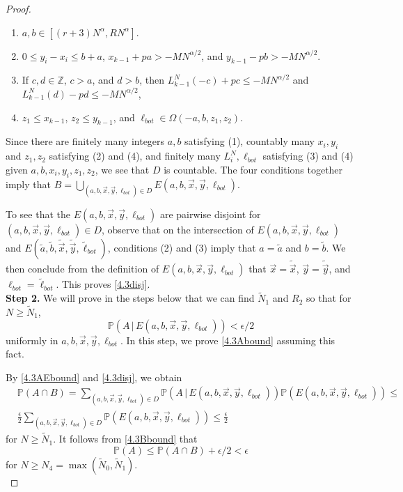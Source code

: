 \begin{proof}
\begin{enumerate}[label=(\arabic*)]
			\item $a,b\in[(r+3)N^\alpha,RN^\alpha]$.
			
			\item $0 \leq y_i - x_i \leq b+a$, $x_{k-1} + pa > - MN^{\alpha/2}$, and $y_{k-1} - pb > - MN^{\alpha/2}$.
			
			\item If $c,d\in\mathbb{Z}$, $c > a$, and $d > b$, then $L_{k-1}^N(-c) + pc \leq -MN^{\alpha/2}$ and $L_{k-1}^N(d) - pd \leq -MN^{\alpha/2}$,
			
			\item $z_1\leq x_{k-1}$, $z_2\leq y_{k-1}$, and $\ell_{bot}\in\Omega(-a,b,z_1,z_2)$.
			
		\end{enumerate} 
		Since there are finitely many integers $a,b$ satisfying (1), countably many $x_i,y_i$ and $z_1,z_2$ satisfying (2) and (4), and finitely many $L_i^N,\ell_{bot}$ satisfying (3) and (4) given $a,b,x_i,y_i,z_1,z_2$, we see that $D$ is countable. The four conditions together imply that $B = \bigcup_{(a,b,\vec{x},\vec{y},\ell_{bot})\in D} E(a,b,\vec{x},\vec{y},\ell_{bot})$.
		
		To see that the $E(a,b,\vec{x},\vec{y},\ell_{bot})$ are pairwise disjoint for $(a,b,\vec{x},\vec{y},\ell_{bot})\in D$, observe that on the intersection of $E(a,b,\vec{x},\vec{y},\ell_{bot})$ and $E(\tilde a,\tilde b,\tilde{\vec{x}},\tilde{\vec{y}},\tilde{\ell}_{bot})$, conditions (2) and (3) imply that $a=\tilde{a}$ and $b=\tilde{b}$. We then conclude from the definition of $E(a,b,\vec{x},\vec{y},\ell_{bot})$ that $\vec{x}=\tilde{\vec{x}}$, $\vec{y} = \tilde{\vec{y}}$, and $\ell_{bot} = \tilde{\ell}_{bot}$. This proves \eqref{4.3disj}.\\
		
		\noindent\textbf{Step 2.} We will prove in the steps below that we can find $\tilde{N}_1$ and $R_2$ so that for $N\geq\tilde{N}_1$,
		\begin{equation}\label{4.3AEbound}
		\mathbb{P}(A\,|\,E(a,b,\vec{x},\vec{y},\ell_{bot})) < \epsilon/2
		\end{equation}
		uniformly in $a,b,\vec{x},\vec{y},\ell_{bot}$. In this step, we prove \eqref{4.3Abound} assuming this fact.
		
		By \eqref{4.3AEbound} and \eqref{4.3disj}, we obtain
		\begin{align*}
		&\mathbb{P}(A \cap B) = \sum_{(a,b,\vec{x},\vec{y},\ell_{bot})\in D} \mathbb{P}(A\,|\,E(a,b,\vec{x},\vec{y},\ell_{bot}))\mathbb{P}(E(a,b,\vec{x},\vec{y},\ell_{bot})) \leq\\
		& \frac{\epsilon}{2}\sum_{(a,b,\vec{x},\vec{y},\ell_{bot})\in D} \mathbb{P}(E(a,b,\vec{x},\vec{y},\ell_{bot})) \leq \frac{\epsilon}{2}
		\end{align*}
		for $N\geq\tilde{N}_1$. It follows from \eqref{4.3Bbound} that
		\begin{equation*}
		\mathbb{P}(A) \leq \mathbb{P}(A\cap B) + \epsilon/2 < \epsilon
		\end{equation*}
		for $N\geq N_4 = \max(\tilde{N}_0,\tilde{N}_1)$.\\
		

\end{proof}
